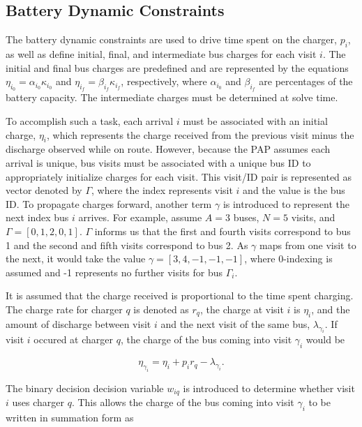 \documentclass[letterpaper, 10pt, conference]{IEEEtran}
\begin{document}
\subsection{Battery Dynamic Constraints}
The battery dynamic constraints are used to drive time spent on the charger, $p_i$, as well as define initial, final, and intermediate bus charges for each visit $i$. The initial and final bus charges are predefined and are represented by the equations $\eta_{i_0} = \alpha_{i_0} \kappa_{i_0}$ and $\eta_{i_f} = \beta_{i_f} \kappa_{i_f}$, respectively, where $\alpha_{i_0}$ and $\beta_{i_f}$ are percentages of the battery capacity. The intermediate charges must be determined at solve time.

To accomplish such a task, each arrival $i$ must be associated with an initial charge, $\eta_i$, which represents the charge received from the previous visit minus the discharge observed while on route. However, because the PAP assumes each arrival is unique, bus visits must be associated with a unique bus ID to appropriately initialize charges for each visit. This visit/ID pair is represented as vector denoted by $\Gamma$, where the index represents visit $i$ and the value is the bus ID. To propagate charges forward, another term $\gamma$ is introduced to represent the next index bus $i$ arrives. For example, assume $A = 3$ buses, $N = 5$ visits, and $\Gamma = [0,1,2,0,1]$. $\Gamma$ informs us that the first and fourth visits correspond to bus 1 and the second and fifth visits correspond to bus 2. As $\gamma$ maps from one visit to the next, it would take the value $\gamma = [3,4,-1,-1,-1]$, where 0-indexing is assumed and -1 represents no further visits for bus $\Gamma_i$.

It is assumed that the charge received is proportional to the time spent charging. The charge rate for charger $q$ is denoted as $r_q$, the charge at visit $i$ is $\eta_i$, and the amount of discharge between visit $i$ and the next visit of the same bus, $\lambda_{\gamma_i}$. If visit $i$ occured at charger $q$, the charge of the bus coming into visit $\gamma_i$ would be

\begin{equation}
	\eta_{\gamma_i} = \eta_i + p_i r_q - \lambda_{\gamma_i}.
\end{equation}

The binary decision decision variable $w_{iq}$ is introduced to determine whether visit $i$ uses charger $q$. This allows the charge of the bus coming into visit $\gamma_i$ to be written in summation form as
\end{document}
